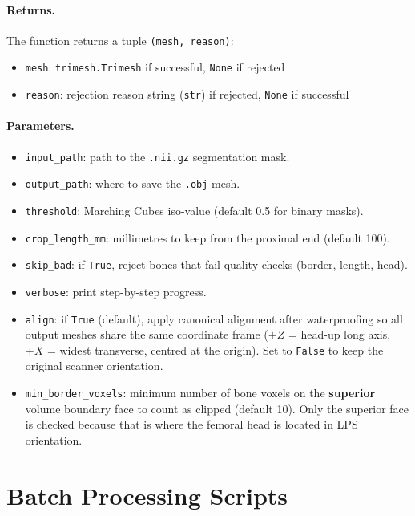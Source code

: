 \documentclass[12pt,a4paper]{article}
\begin{document}
\paragraph{Returns.}
The function returns a tuple \texttt{(mesh, reason)}:
\begin{itemize}
    \item \texttt{mesh}: \texttt{trimesh.Trimesh} if successful, \texttt{None} if rejected
    \item \texttt{reason}: rejection reason string (\texttt{str}) if rejected,
          \texttt{None} if successful
\end{itemize}

\paragraph{Parameters.}
\begin{itemize}
    \item \texttt{input\_path}: path to the \texttt{.nii.gz} segmentation mask.
    \item \texttt{output\_path}: where to save the \texttt{.obj} mesh.
    \item \texttt{threshold}: Marching Cubes iso-value (default 0.5 for binary masks).
    \item \texttt{crop\_length\_mm}: millimetres to keep from the proximal end
          (default 100).
    \item \texttt{skip\_bad}: if \texttt{True}, reject bones that fail quality
          checks (border, length, head).
    \item \texttt{verbose}: print step-by-step progress.
    \item \texttt{align}: if \texttt{True} (default), apply canonical alignment
          after waterproofing so all output meshes share the same coordinate
          frame ($+Z$ = head-up long axis, $+X$ = widest transverse, centred at
          the origin).  Set to \texttt{False} to keep the original scanner
          orientation.
    \item \texttt{min\_border\_voxels}: minimum number of bone voxels on the
          \textbf{superior} volume boundary face to count as clipped (default
          10).  Only the superior face is checked because that is where the
          femoral head is located in LPS orientation.
\end{itemize}


\section{Batch Processing Scripts}
\end{document}
